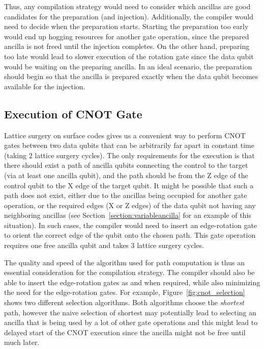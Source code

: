 Thus, any compilation strategy would need to consider which ancillas are good candidates for the preparation (and injection). Additionally, the compiler would need to decide when the preparation starts. Starting the preparation too early would end up hogging resources for another gate operation, since the prepared ancilla is not freed until the injection completes. On the other hand, preparing too late would lead to slower execution of the rotation gate since the data qubit would be waiting on the preparing ancilla. In an ideal scenario, the preparation should begin so that the ancilla is prepared exactly when the data qubit becomes available for the injection.


\subsection{Execution of CNOT Gate}
Lattice surgery on surface codes gives us a convenient way to perform CNOT gates between two data qubits that can be arbitrarily far apart in constant time (taking $2$ lattice surgery cycles). The only requirements for the execution is that there should exist a path of ancilla qubits connecting the control to the target (via at least one ancilla qubit), and the path should be from the Z edge of the control qubit to the X edge of the target qubit. It might be possible that such a path does not exist, either due to the ancillas being occupied for another gate operation, or the required edges (X or Z edges) of the data qubit not having any neighboring ancillas (see Section~\ref{section:variableancilla} for an example of this situation). In such cases, the compiler would need to insert an edge-rotation gate to orient the correct edge of the qubit onto the chosen path. This gate operation requires one free ancilla qubit and takes $3$ lattice surgery cycles.\par
The quality and speed of the algorithm used for path computation is thus an essential consideration for the compilation strategy. The compiler should also be able to insert the edge-rotation gates as and when required, while also minimizing the need for the edge-rotation gates. For example, Figure~\ref{fig:cnot_selection} shows two different selection algorithms. Both algorithms choose the \textit{shortest} path, however the naive selection of shortest may potentially lead to selecting an ancilla that is being used by a lot of other gate operations and this might lead to delayed start of the CNOT execution since the ancilla might not be free until much later.
